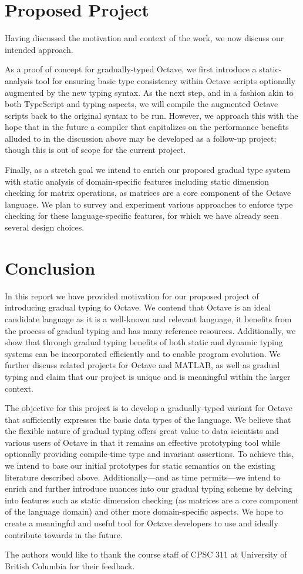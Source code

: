 \section{Proposed Project}
Having discussed the motivation and context of the work, we now discuss our intended approach.

As a proof of concept for gradually-typed Octave, we first introduce a static-analysis tool for ensuring basic type consistency within Octave scripts optionally augmented by the new typing syntax. As the next step, and in a fashion akin to both TypeScript and typing aspects, we will compile the augmented Octave scripts back to the original syntax to be run. However, we approach this with the hope that in the future a compiler that capitalizes on the performance benefits alluded to in the discussion above may be developed as a follow-up project; though this is out of scope for the current project.

Finally, as a stretch goal we intend to enrich our proposed gradual type system with static analysis of domain-specific features including static dimension checking for matrix operations, as matrices are a core component of the Octave language. We plan to survey and experiment various approaches to enforce type checking for these language-specific features, for which we have already seen several design choices.

\section{Conclusion}
In this report we have provided motivation for our proposed project of introducing gradual typing to Octave. We contend that Octave is an ideal candidate language as it is a well-known and relevant language, it benefits from the process of gradual typing and has many reference resources. Additionally, we show that through gradual typing benefits of both static and dynamic typing systems can be incorporated efficiently and to enable program evolution. We further discuss related projects for Octave and MATLAB, as well as gradual typing and claim that our project is unique and is meaningful within the larger context.
 
The objective for this project is to develop a gradually-typed variant for Octave that sufficiently expresses the basic data types of the language. We believe that the flexible nature of gradual typing offers great value to data scientists and various users of Octave in that it remains an effective prototyping tool while optionally providing compile-time type and invariant assertions. To achieve this, we intend to base our initial prototypes for static semantics on the existing literature described above. Additionally---and as time permits---we intend to enrich and further introduce nuances into our gradual typing scheme by delving into features such as static dimension checking (as matrices are a core component of the language domain) and other more domain-specific aspects. We hope to create a meaningful and useful tool for Octave developers to use and ideally contribute towards in the future.


\appendix

\begin{acks}
    The authors would like to thank the course staff of CPSC 311 at University
    of British Columbia for their feedback.
\end{acks}